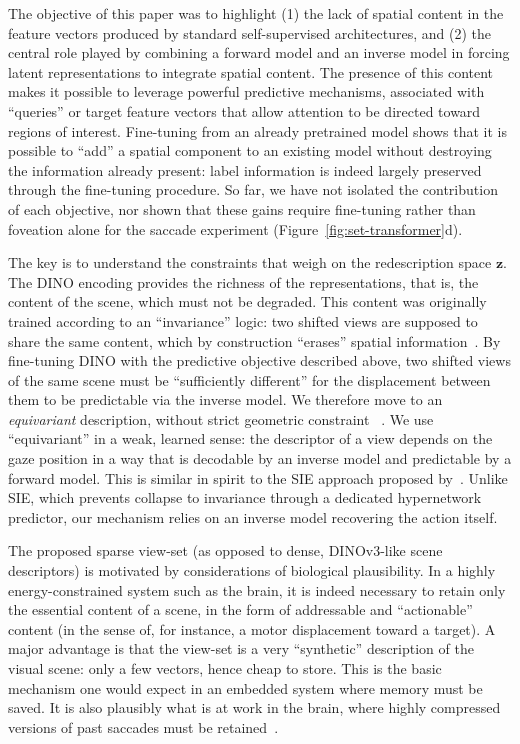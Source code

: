 \documentclass{article}
\begin{document}
The objective of this paper was to highlight (1) the lack of spatial content in the feature vectors produced by standard self-supervised architectures, and (2) the central role played by combining a forward model and an inverse model in forcing latent representations to integrate spatial content. The presence of this content makes it possible to leverage powerful predictive mechanisms, associated with ``queries'' or target feature vectors that allow attention to be directed toward regions of interest. Fine-tuning from an already pretrained model shows that it is possible to ``add'' a spatial component to an existing model without destroying the information already present: label information is indeed largely preserved through the fine-tuning procedure. So far, we have not isolated the contribution of each objective, nor shown that these gains require fine-tuning rather than foveation alone for the saccade experiment (Figure~\ref{fig:set-transformer}d).

The key is to understand the constraints that weigh on the redescription space $\boldsymbol{z}$. The DINO encoding provides the richness of the representations, that is, the content of the scene, which must not be degraded. This content was originally trained according to an ``invariance'' logic: two shifted views are supposed to share the same content, which by construction ``erases'' spatial information~\cite{caron2021emerging,chen2020simple}. By fine-tuning DINO with the predictive objective described above, two shifted views of the same scene must be ``sufficiently different'' for the displacement between them to be predictable via the inverse model. We therefore move to an \emph{equivariant} description, without strict geometric constraint ~\cite{cohen2016group}. We use ``equivariant'' in a weak, learned sense: the descriptor of a view depends on the gaze position in a way that is decodable by an inverse model and predictable by a forward model. This is similar in spirit to the SIE approach proposed by~\cite{dangovski2022equivariant, garrido2023sie}. Unlike SIE, which prevents collapse to invariance through a dedicated hypernetwork predictor, our mechanism relies on an inverse model recovering the action itself.

The proposed sparse view-set (as opposed to dense, DINOv3-like scene descriptors) is motivated by considerations of biological plausibility. In a highly energy-constrained system such as the brain, it is indeed necessary to retain only the essential content of a scene, in the form of addressable and ``actionable'' content (in the sense of, for instance, a motor displacement toward a target). A major advantage is that the view-set is a very ``synthetic'' description of the visual scene: only a few vectors, hence cheap to store. This is the basic mechanism one would expect in an embedded system where memory must be saved. It is also plausibly what is at work in the brain, where highly compressed versions of past saccades must be retained~\cite{irwin1991information}.
\end{document}
